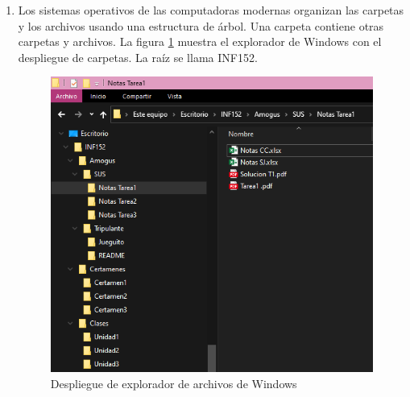 \documentclass[letterpaper,10pt]{article}
\begin{document}
\begin{enumerate}
\begin{enumerate}
\item Utilizando el paquete Tikz de \LaTeX, dibuje los Grafos 1 y 2 expresados como matriz de adyacencia en las Tablas 1 y 2. No se aceptarán imágenes \textit{(El package ya está incluido en el header)} [10 pts].

\textbf{Solución:}

\item Demuestre o refute la existencia de un circuito de Euler en el grafo 2. ¿Existe Camino de Euler? En caso de que exista, nombre uno. [15 pts].

\textbf{Solución:}

\item Demuestre o refute: Grafo \textbf{1} y Grafo \textbf{3} son isomorfos [20 pts]

\textbf{Solución:}


\end{enumerate}
\newpage
\item Los sistemas operativos de las computadoras modernas organizan las carpetas y los archivos usando una estructura de árbol. Una carpeta contiene otras carpetas y archivos. La figura \ref{fig:archivos} muestra el explorador de Windows con el despliegue de carpetas. La raíz se llama INF152.

\begin{center}
    \begin{figure}[H]
    \centering
        \includegraphics[scale=0.6]{inf152.png}
        \caption{Despliegue de explorador de archivos de Windows}
        \label{fig:archivos}
    \end{figure}
\end{center}


\end{enumerate}
\end{document}
